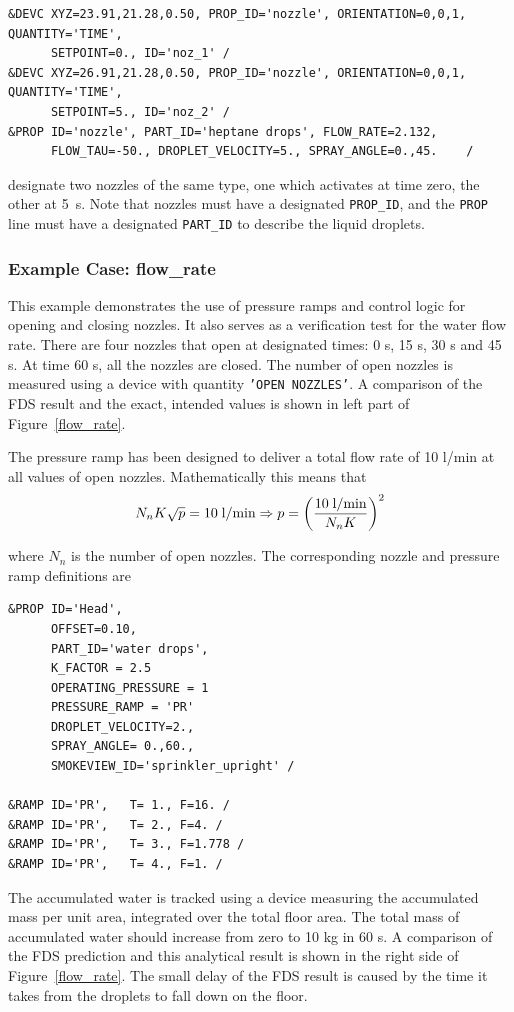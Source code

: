 \documentclass[11pt]{book}
\newcommand{\ct}{\tt\small}
\newcommand{\be}{\begin{equation}}
\newcommand{\ee}{\end{equation}}
\begin{document}
\footnotesize
\begin{verbatim}
&DEVC XYZ=23.91,21.28,0.50, PROP_ID='nozzle', ORIENTATION=0,0,1, QUANTITY='TIME',
      SETPOINT=0., ID='noz_1' /
&DEVC XYZ=26.91,21.28,0.50, PROP_ID='nozzle', ORIENTATION=0,0,1, QUANTITY='TIME',
      SETPOINT=5., ID='noz_2' /
&PROP ID='nozzle', PART_ID='heptane drops', FLOW_RATE=2.132,
      FLOW_TAU=-50., DROPLET_VELOCITY=5., SPRAY_ANGLE=0.,45.    /
\end{verbatim}
\normalsize

\noindent
designate two nozzles of the same type, one which activates at time zero, the other at 5~s. Note that nozzles must have a designated
{\ct PROP\_ID}, and the {\ct PROP} line must have a designated {\ct PART\_ID} to describe the liquid droplets.

\subsubsection{Example Case: {\bf flow\_rate}}

This example demonstrates the use of pressure ramps and control logic for opening and closing nozzles. It also serves as a verification test for
the water flow rate. There are four nozzles that open at designated times: 0 s, 15 s, 30 s and 45 s. At time 60 s, all the nozzles are closed.
The number of open nozzles is measured using a device with quantity {\ct 'OPEN NOZZLES'}. A comparison of the FDS result and the exact, intended values
is shown in left part of Figure~\ref{flow_rate}.

The pressure ramp has been designed to deliver a total flow rate of 10 l/min at all values of open nozzles. Mathematically this means that
\be
N_n K \sqrt{p} = 10 \;\hbox{l/min} \Rightarrow
p = \left( \frac{10 \;\hbox{l/min}}{N_n K}\right)^2
\ee

\noindent
where $N_n$ is the number of open nozzles. The corresponding nozzle and pressure ramp definitions are
\footnotesize
\begin{verbatim}
&PROP ID='Head',
      OFFSET=0.10,
      PART_ID='water drops',
      K_FACTOR = 2.5
      OPERATING_PRESSURE = 1
      PRESSURE_RAMP = 'PR'
      DROPLET_VELOCITY=2.,
      SPRAY_ANGLE= 0.,60.,
      SMOKEVIEW_ID='sprinkler_upright' /

&RAMP ID='PR',   T= 1., F=16. /
&RAMP ID='PR',   T= 2., F=4. /
&RAMP ID='PR',   T= 3., F=1.778 /
&RAMP ID='PR',   T= 4., F=1. /
\end{verbatim}
\normalsize

The accumulated water is tracked using a device measuring the accumulated mass per unit area, integrated over the total floor area. The total mass of accumulated water should increase from zero to 10 kg in 60 s. A comparison of the FDS prediction and this analytical result is shown in the right side of Figure~\ref{flow_rate}. The small delay of the FDS result is caused by the time it takes from the droplets to fall down on the floor.
\end{document}
